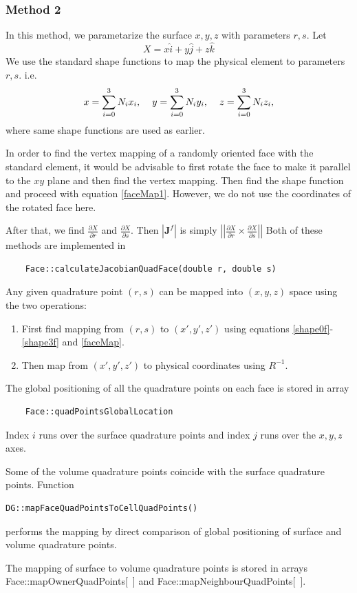 \subsubsection{Method 2}
In this method, we parametarize the surface $x,y,z$ with parameters $r,s$.
Let $$X = x\hat{i} + y\hat{j} + z\hat{k}$$ 
We use the standard shape functions to map the physical element to parameters $r,s$.
i.e.
\begin{equation}\label{faceMap1}
	x = \sum_{i=0}^3 N_i x_i, \hspace{4mm}y = \sum_{i=0}^3 N_i y_i, \hspace{4mm}z = \sum_{i=0}^3 N_i z_i,
\end{equation}
where same shape functions are used as earlier. 
\begin{note}
In order to find the vertex mapping of a randomly oriented face with the standard
element, it would be advisable to first rotate the face to make it parallel to the $xy$ plane and then
find the vertex mapping. Then find the shape function and proceed with equation \ref{faceMap1}. 
However, we do not use the coordinates of the rotated face here. 
\end{note}
After that, we find $\frac{\partial X}{\partial r}$ and $\frac{\partial X}{\partial s}$.
Then $|\mathbf{J}^{f}|$  is simply $\left|\left| \frac{\partial X}{\partial r} \times \frac{\partial X}{\partial s}\right|\right|$
Both of these methods are implemented in 
\begin{verbatim}
	Face::calculateJacobianQuadFace(double r, double s)
\end{verbatim}
Any given quadrature point $(r,s)$ can be mapped into $(x,y,z)$ space using the two operations:
\begin{enumerate}
	\item First find mapping from $(r,s)$ to $(x',y',z')$ using equations \ref{shape0f}-\ref{shape3f} and 
		\ref{faceMap}.
	\item Then map from $(x',y',z')$ to physical coordinates using $R^{-1}$.
\end{enumerate}
The global positioning of all the quadrature points on each face is 
stored in array 
\begin{verbatim}
	Face::quadPointsGlobalLocation
\end{verbatim}
Index $i$ runs over the surface quadrature points and index $j$ runs over the $x,y,z$ axes.
\begin{note}
	Some of the volume quadrature points coincide with the surface quadrature points. Function \begin{verbatim}DG::mapFaceQuadPointsToCellQuadPoints() \end{verbatim} performs the mapping by direct comparison of global positioning of surface and volume quadrature points.
\end{note}
\noindent
The mapping of surface to volume quadrature points is stored in arrays \newline Face::mapOwnerQuadPoints[~] and Face::mapNeighbourQuadPoints[~]. 

